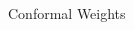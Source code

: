 \begin{columns}[T]
\begin{column}{.5\textwidth}
\begin{block}{Conformal Weights}
\end{block}

%

\end{column}
\end{columns}
